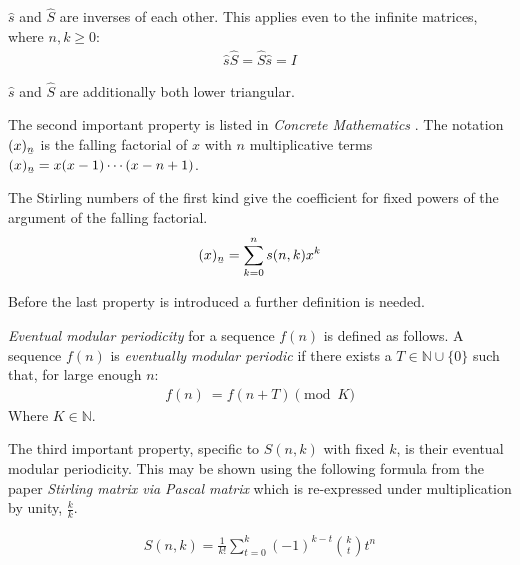 \documentclass[12pt,reqno]{article}
\newcommand{\ubar}[1]{\text{\b{$#1$}}}
\begin{document}
\begin{proposition}
	$\hat{s}$ and $\hat{S}$ are inverses of each other. This applies even to the infinite matrices, where $n,k \geq 0$:
	\begin{align}
	\hat{s} \hat{S} = \hat{S} \hat{s} = I \label{eqn:stirlinginvs}
	\end{align}

	$\hat{s}$ and $\hat{S}$ are additionally both lower triangular.

\end{proposition}

The second important property is listed in {\em Concrete Mathematics} \cite{cc:cm}.
The notation $(x)_{\ubar{n}}$ is the falling factorial of $x$ with $n$ multiplicative terms $(x)_{\ubar{n}} = x (x - 1) \cdots (x - n  + 1)$.

\begin{proposition}
	The Stirling numbers of the first kind give the coefficient for fixed powers of the argument of the falling factorial.
	\begin{align}
		(x)_{\ubar{n}} = \sum_{k = 0}^{n} s(n,k) x^{k}\label{eqn:fallfac}
	\end{align}
\end{proposition}

Before the last property is introduced a further definition is needed.

\begin{definition}
	{\em Eventual modular periodicity} for a sequence $f(n)$ is defined as follows. A sequence $f(n)$ is {\em eventually modular periodic} if there exists a $T \in \mathbb{N} \cup \{0\}$ such that,
	for large enough $n$:
	\begin{align}
		f(n)~{}  = f(n + T) \pmod{K}
	\end{align}
Where $K \in \mathbb{N}$.
\end{definition}

The third important property, specific to $S(n,k)$ with fixed $k$, is their eventual modular periodicity. This may be shown using the following formula from the paper \textit{Stirling matrix via Pascal matrix} \cite{cc:relation} which is re-expressed under multiplication by unity, $\frac{k}{k}$.

\begin{lemma}
	\begin{align}
		S(n,k) = \frac{1}{k!} \sum_{t = 0}^{k}(-1)^{k-t}\binom{k}{t} t^{n}\label{eqn:stirlingsecond}
	\end{align}
\end{lemma}
\end{document}
